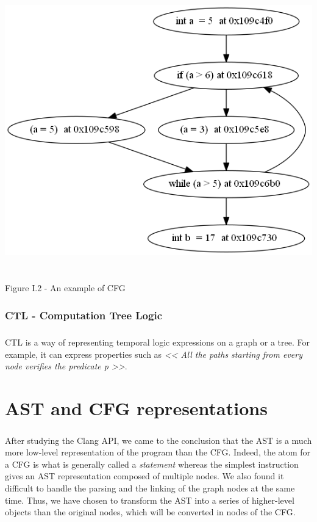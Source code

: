\documentclass{report}
\begin{document}
\begin{center}
\includegraphics[scale=0.45]{data/doWhile.png}
~\\~\\Figure I.2 - An example of CFG
\end{center}

\subsection{CTL - Computation Tree Logic}

\paragraph{}
\hspace{4mm}\textnormal{CTL is a way of representing temporal logic expressions on a graph or a tree. For example, it can
express properties such as \textit{<< All the paths starting from every node verifies the predicate p >>}.}

\chapter{AST and CFG representations}

\paragraph{}
\hspace{4mm}\textnormal{After studying the Clang API, we came to the conclusion that the AST is a much more low-level representation of the program than the CFG. 
Indeed, the atom for a CFG is what is generally called a \textit{statement} whereas the simplest instruction
gives an AST representation composed of multiple nodes. We also found it difficult to handle the parsing and the linking of the graph nodes at the same time.
Thus, we have chosen to transform the AST into a series of higher-level objects than the original nodes, which will be converted
in nodes of the CFG.}
\end{document}
